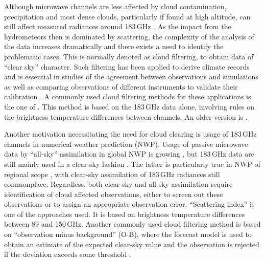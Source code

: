 \documentclass[amt, manuscript]{copernicus}
\begin{document}
Although microwave channels are less affected by cloud contamination, precipitation and most dense clouds, particularly if found at high altitude, can
still affect measured radiances around 183\,GHz
\citep[e.g.][]{bennartz2003sensitivity}. As the impact from the hydrometeors
then is dominated by scattering, the complexity of the analysis of the data
increases dramatically and there exists a need to identify the problematic
cases. This is normally denoted as cloud filtering, to obtain data of ``clear
sky'' character. Such filtering has been applied to derive climate records
\citep{lang2020new} and is essential in studies of the agreement between
observations and simulations \citep{brogniez2016review} as well as 
comparing observations of different instruments to validate their calibration
\citep{john2013assessment,moradi:retri:15,berg2016intercalibration}. A commonly
used cloud filtering methods for these applications is the one of
\citet{buehler:aclou:07}. This method is based on the 183\,GHz data alone,
involving rules on the brightness temperature differences between channels. An
older version is \citet{burns1997effects}. 

Another motivation necessitating the need for cloud clearing is usage of 183\,GHz channels in 
numerical weather prediction (NWP). Usage of passive microwave data by
``all-sky'' assimilation in global NWP is growing \citep{geer2017growing},
but 183\,GHz data are still mainly used in a clear-sky fashion
\citep{geer2018all}. The latter is particularly true in NWP of regional scope
\citep{gustafsson2018survey}, with clear-sky assimilation of 183\,GHz radiances still commonplace. Regardless, both clear-sky and all-sky assimilation require identification of cloud affected observations, either to screen out these observations or to assign an appropriate observation error. ``Scattering index'' \citep{geer2015scatteringindex} is one of the approaches used. It is based on brightness temperature differences between 89 and 150\,GHz. Another commonly used cloud filtering method is based on ``observation minus background'' (O-B), where the forecast model is used to obtain an estimate of the expected clear-sky value and the observation is rejected if the deviation exceeds some threshold \citep{English1999clouddetection}. 
\end{document}
